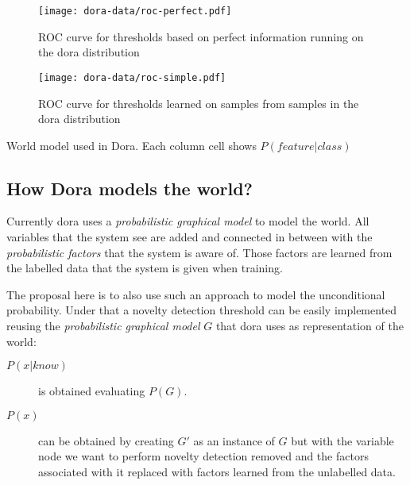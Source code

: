 \documentclass[a4paper]{article}
\begin{document}


\begin{figure}
\centering
\texttt{[image: dora-data/roc-perfect.pdf]}
\caption{\label{tab:dora-data-perfect}ROC curve for thresholds based on perfect information running on the dora distribution}
\end{figure}

\begin{figure}
\centering
\texttt{[image: dora-data/roc-simple.pdf]}
\caption{\label{tab:dora-data-simple}ROC curve for thresholds learned on samples from samples in the dora distribution}
\end{figure}

\begin{sidewaystable}[h]
\begin{center}
\scalebox{0.35}{}
\end{center}
\caption{\label{tab:dora-world-distribution}World model used in Dora. Each column cell shows $P(feature|class)$}
\end{sidewaystable}

\subsection{How Dora models the world?}
\label{sec:dora-models}

Currently dora uses a \emph{probabilistic graphical model} to model the world.
All variables that the system see are added and connected in between with the
\emph{probabilistic factors} that the system is aware of.
Those factors are learned from the labelled data that the system is given when
training.

The proposal here is to also use such an approach to model the unconditional
probability.
Under that a novelty detection threshold can be easily implemented
reusing the \emph{probabilistic graphical model} $G$ that dora uses as
representation of the world:
\begin{description}
\item[$P(x|know)$] is obtained evaluating $P(G)$.
\item[$P(x)$] can be obtained by creating $G'$ as an instance of $G$ but with the
variable node we want to perform novelty detection removed and the factors associated
with it replaced with factors learned from the unlabelled data.
\end{description}
\end{document}
